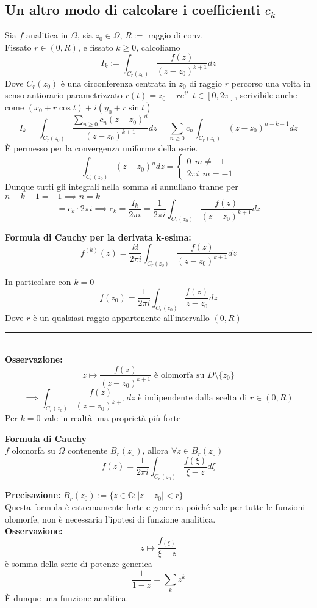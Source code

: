 \documentclass[a4paper]{article}
\newcommand{\C}{\mathbb{C}}
\newcommand{\divider}{\noindent\rule{\textwidth}{0.5pt}}
\begin{document}
\subsection{Un altro modo di calcolare i coefficienti $c_k$} 
Sia $f$ analitica in $\Omega$, sia $z_0\in\Omega$, $R:=$ raggio di conv.
\\Fissato $r\in(0,R)$, e fissato $k\ge 0$, calcoliamo 
\[I_k:=\int_{C_r(z_0)}^{} \frac{f(z)}{(z-z_0)^{k+1}}dz
\]
Dove $C_r(z_0)$ è una circonferenza centrata in $z_0$ di raggio $r$ percorso una volta in senso antiorario parametrizzato $r(t)=z_0+re^{i t}\ \ t\in[0,2\pi]$, scrivibile anche come $(x_0+r\cos t)+i(y_0+r\sin t)$
\[I_k=\int_{C_r(z_0)}^{} \frac{\sum_{n\ge 0}^{} c_n(z-z_0)^n}{(z-z_0)^{k+1}}dz=\sum_{n\ge 0}^{} c_n\int_{C_r(z_0)}^{} (z-z_0)^{n-k-1}dz\]
È permesso per la convergenza uniforme della serie.
\[\int_{C_r(z_0)}^{} (z-z_0)^ndz=\begin{cases}
	0\ \ m\neq -1\\2\pi i\ \ m=-1 
\end{cases}  \]
Dunque tutti gli integrali nella somma si annullano tranne per $n-k-1=-1\implies n=k$ 
\[=c_k\cdot 2\pi i\implies c_k= \frac{I_k}{2\pi i}= \frac{1}{2\pi i}\int_{C_r(z_0)}^{} \frac{f(z)}{(z-z_0)^{k+1}}dz\]
\begin{tcolorbox}
	\textbf{Formula di Cauchy per la derivata k-esima:} 
	\[f^{(k)}(z)=\frac{k!}{2\pi i}\int_{C_r(z_0)}^{} \frac{f(z)}{(z-z_0)^{k+1}}dz\]
\end{tcolorbox}
In particolare con $k=0$
\[f(z_0)=\frac{1}{2\pi i}\int_{C_r(z_0)}^{} \frac{f(z)}{z-z_0}dz\]
Dove $r$ è un qualsiasi raggio appartenente all'intervallo $(0,R)$
\\\divider
\\\textbf{Osservazione: } \[z\mapsto   \frac{f(z)}{(z-z_0)^{k+1}}\text{ è olomorfa su }D\setminus \{z_0\} \]
\[\implies \int_{C_r(z_0)}^{}  \frac{f(z)}{(z-z_0)^{k+1}}dz \text{ è indipendente dalla scelta di }r\in(0,R)\]
Per $k=0$ vale in realtà una proprietà più forte
\begin{tcolorbox}
	\textbf{Formula di Cauchy} \\
	$f$ olomorfa su $\Omega$ contenente $\overline{B_r(z_0)}$, allora $\forall z\in B_r(z_0)$
	\[f(z)=\frac{1}{2\pi i}\int_{C_r(z_0)}^{}  \frac{f(\xi)}{\xi-z}d\xi\]
\end{tcolorbox}
\textbf{Precisazione: }$B_r(z_0):=\{z\in\C: |z-z_0|<r\}$ 
\\Questa formula è estremamente forte e generica poiché vale per tutte le funzioni olomorfe, non è necessaria l'ipotesi di funzione analitica.
\\\textbf{Osservazione: }\[z\mapsto \frac{f_(\xi)}{\xi-z}\] è somma della serie di potenze generica 
\[\frac{1}{1-z}=\sum_{k}^{} z^k\]
È dunque una funzione analitica.
\end{document}

